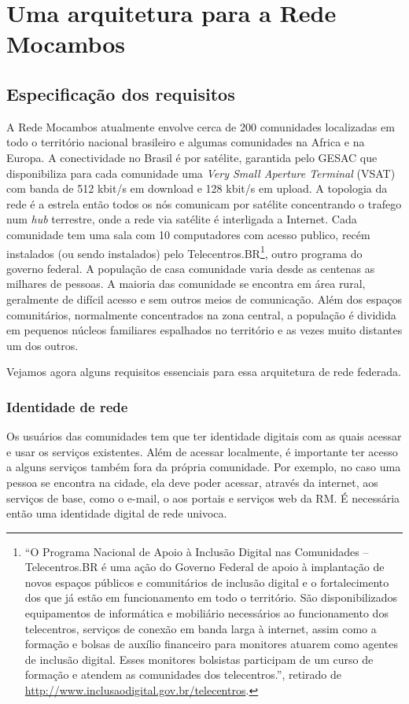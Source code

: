 
\chapter{Uma arquitetura para a Rede Mocambos}
\label{Capitolo3}

\section{Especificação dos requisitos}
A Rede Mocambos atualmente envolve cerca de 200 comunidades
localizadas em todo o território nacional brasileiro e algumas
comunidades na Africa e na Europa. A conectividade no Brasil é por
satélite, garantida pelo GESAC que disponibiliza para cada comunidade
uma \emph{Very Small Aperture Terminal} (VSAT) com banda de 512 kbit/s
em download e 128 kbit/s em upload. A topologia da rede é a estrela
então todos os nós comunicam por satélite concentrando o trafego num
\emph{hub} terrestre, onde a rede via satélite é interligada a
Internet. Cada comunidade tem uma sala com 10 computadores com acesso
publico, recém instalados (ou sendo instalados) pelo
Telecentros.BR\footnote{``O Programa Nacional de Apoio à Inclusão
  Digital nas Comunidades – Telecentros.BR é uma ação do Governo
  Federal de apoio à implantação de novos espaços públicos e
  comunitários de inclusão digital e o fortalecimento dos que já estão
  em funcionamento em todo o território. São disponibilizados
  equipamentos de informática e mobiliário necessários ao
  funcionamento dos telecentros, serviços de conexão em banda larga à
  internet, assim como a formação e bolsas de auxílio financeiro para
  monitores atuarem como agentes de inclusão digital. Esses monitores
  bolsistas participam de um curso de formação e atendem as
  comunidades dos telecentros.'', retirado de
  \url{http://www.inclusaodigital.gov.br/telecentros}.}, outro
programa do governo federal. A população de casa comunidade varia
desde as centenas as milhares de pessoas. A maioria das comunidade se
encontra em área rural, geralmente de difícil acesso e sem outros
meios de comunicação. Além dos espaços comunitários, normalmente
concentrados na zona central, a população é dividida em pequenos
núcleos familiares espalhados no território e as vezes muito distantes
um dos outros.

Vejamos agora alguns requisitos essenciais para essa arquitetura de
rede federada.

\subsection{Identidade de rede}
Os usuários das comunidades tem que ter identidade digitais com as
quais acessar e usar os serviços existentes. Além de acessar
localmente, é importante ter acesso a alguns serviços também fora da
própria comunidade. Por exemplo, no caso uma pessoa se encontra na
cidade, ela deve poder acessar, através da internet, aos serviços de
base, como o e-mail, o aos portais e serviços web da RM. É necessária
então uma identidade digital de rede univoca. 

